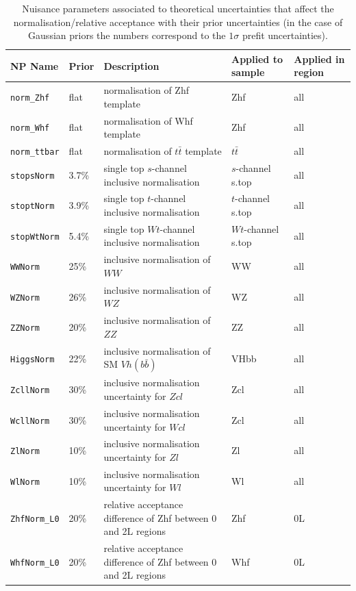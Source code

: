 \begin{table}[H]
    \centering
    \scriptsize
    \begin{tabular}{|p{2.5cm}|p{1.5cm}|p{3cm}|p{2.5cm}|p{1.5cm}|}
        \hline
        NP Name & Prior & Description & Applied to sample & Applied in region \\
        \hline
        \texttt{norm\_Zhf} & flat & normalisation of Zhf template & Zhf & all \\
        \texttt{norm\_Whf} & flat & normalisation of Whf template & Zhf & all \\
        \texttt{norm\_ttbar} & flat & normalisation of $t\bar{t}$ template & $t\bar{t}$ & all \\
        \hline
        \hline
        \texttt{stopsNorm} & 3.7\% & single top $s$-channel inclusive normalisation & $s$-channel s.top & all \\
        \texttt{stoptNorm} & 3.9\% & single top $t$-channel inclusive normalisation & $t$-channel s.top & all \\
        \texttt{stopWtNorm} & 5.4\% & single top $Wt$-channel inclusive normalisation & $Wt$-channel s.top & all \\
        \texttt{WWNorm} & 25\% & inclusive normalisation of $WW$ & WW & all \\
        \texttt{WZNorm} & 26\% & inclusive normalisation of $WZ$ & WZ & all \\
        \texttt{ZZNorm} & 20\% & inclusive normalisation of $ZZ$ & ZZ & all \\
        \texttt{HiggsNorm} & 22\% & inclusive normalisation of SM $Vh(b\bar{b})$ & VHbb & all \\
        \hline
        \hline
        \texttt{ZcllNorm} & 30\% & inclusive normalisation uncertainty for $Zcl$ & Zcl & all \\
        \texttt{WcllNorm} & 30\% & inclusive normalisation uncertainty for $Wcl$ & Zcl & all \\
        \texttt{ZlNorm} & 10\% & inclusive normalisation uncertainty for $Zl$ & Zl & all \\
        \texttt{WlNorm} & 10\% & inclusive normalisation uncertainty for $Wl$ & Wl & all \\
        \hline
        \hline
        \texttt{ZhfNorm\_L0} & 20\% & relative acceptance difference of Zhf between 0 and 2L regions & Zhf & 0L \\
        \texttt{WhfNorm\_L0} & 20\% & relative acceptance difference of Zhf between 0 and 2L regions & Whf & 0L \\
        \hline
    \end{tabular}
    \caption{Nuisance parameters associated to theoretical uncertainties that affect the normalisation/relative acceptance with their prior uncertainties (in the case of Gaussian priors the numbers correspond to the $1\sigma$ prefit uncertainties).}
    \label{tab:np-norm1}
\end{table}

